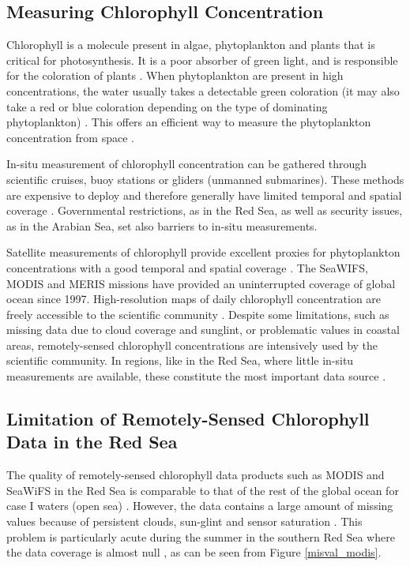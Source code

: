 \subsection{Measuring Chlorophyll Concentration}

Chlorophyll is a molecule present in algae, phytoplankton and plants that is
critical for photosynthesis. It is a poor absorber of green light, and is
responsible for the coloration of plants \citep{Pal2014}. When phytoplankton
are present in high concentrations, the water usually takes a detectable green
coloration (it may also take a red or blue coloration depending on the type of
dominating phytoplankton) \citep{Robinson2010}. This offers an efficient way to
measure the phytoplankton concentration from space \citep{Robinson2010}.

In-situ measurement of chlorophyll concentration can be gathered through
scientific cruises, buoy stations or gliders (unmanned submarines). These
methods are expensive to deploy and therefore generally have limited temporal
and spatial coverage \citep{Robinson2010}. Governmental restrictions,
as in the Red Sea,
as well as security issues, as in the Arabian Sea, set also barriers to in-situ
measurements.

Satellite measurements of chlorophyll provide excellent proxies for
phytoplankton concentrations with a good temporal and spatial coverage
\citep{Robinson2010}. The SeaWIFS, MODIS and MERIS missions have provided an
uninterrupted coverage of global ocean since 1997. High-resolution maps of
daily chlorophyll concentration are freely accessible to the scientific
community \citep{McClain2009}. Despite some limitations, such as missing data
due to cloud coverage and sunglint, or problematic values in coastal areas,
remotely-sensed chlorophyll concentrations are intensively used by the
scientific community. In regions, like in the Red Sea, where little in-situ
measurements are available, these constitute the most important data source
\citep{Raitsos2013, Brewin2013}.

\subsection{Limitation of Remotely-Sensed Chlorophyll Data in the Red Sea}

The quality of remotely-sensed chlorophyll data products such as MODIS and
SeaWiFS in the Red Sea is comparable to that of the rest of the global ocean for
case I waters (open sea) \citep{Brewin2013}. However, the data contains a large
amount of missing values because of persistent clouds, sun-glint and sensor
saturation \citep{Racault}. This problem is particularly acute during the
summer in the southern Red Sea where the data coverage is almost null
\citep{Racault}, as can be seen from Figure \ref{misval_modis}.

